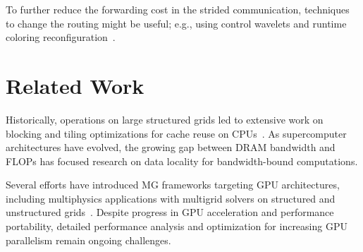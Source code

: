 \documentclass[conference]{IEEEtran}
\begin{document}
        
To further reduce the forwarding cost in the strided communication, techniques to change the routing might be useful; e.g., using control wavelets and runtime coloring reconfiguration~\cite{mathias}.



    
    \section{Related Work}
    
    Historically, operations on large structured grids led to extensive work on blocking and tiling optimizations for cache reuse on CPUs~\cite{Nguyen:2010:BOS:1884643.1884658,Zhou:2012,Yount:2016:YSK:3019129.3019133,Unat2016,Devito}. As supercomputer architectures have evolved, the growing gap between DRAM bandwidth and FLOPs has focused research on data locality for bandwidth-bound computations.
    
    Several efforts have introduced MG frameworks targeting GPU architectures, including multiphysics applications with multigrid solvers on structured and unstructured grids~\cite{Amrex,Anderson,Grete,mali}. Despite progress in GPU acceleration and performance portability, detailed performance analysis and optimization for increasing GPU parallelism remain ongoing challenges.
    
\end{document}
